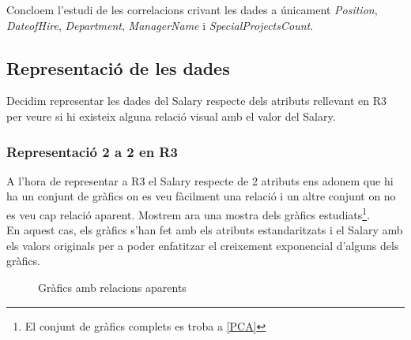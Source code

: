 \documentclass[a4paper, 11pt]{article}
\begin{document}
Concloem l'estudi de les correlacions crivant les dades a únicament \textit{Position}, \textit{DateofHire}, \textit{Department}, \textit{ManagerName} i \textit{SpecialProjectsCount}.
\newpage
\subsection{Representació de les dades}
Decidim representar les dades del Salary respecte dels atributs rellevant en R3 per veure si hi existeix alguna relació visual amb el valor del Salary.
\subsubsection{Representació 2 a 2 en R3}\label{representacio2a2}
A l'hora de representar a R3 el Salary respecte de 2 atributs ens adonem que hi ha un conjunt de gràfics on es veu fàcilment una relació i un altre conjunt on no es veu cap relació aparent. Mostrem ara una mostra dels gràfics estudiats\footnote{El conjunt de gràfics complets es troba a \textcolor{blue}{\ref{PCA}}}.\\
En aquest cas, els gràfics s'han fet amb els atributs estandaritzats i el Salary amb els valors originals per a poder enfatitzar el creixement exponencial d'alguns dels gràfics.
\begin{figure}[h]
 \centering
  \caption{Gràfics amb relacions aparents}
\end{figure}
\end{document}
